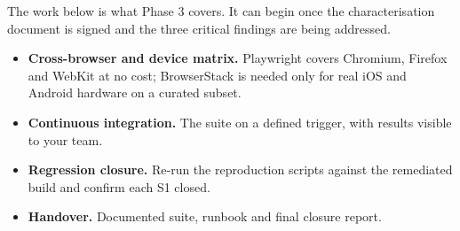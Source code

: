 \documentclass[10pt,a4paper]{article}
\begin{document}
The work below is what Phase 3 covers. It can begin once the characterisation document is
signed and the three critical findings are being addressed.


\begin{itemize}
  \item \textbf{Cross-browser and device matrix.} Playwright covers Chromium, Firefox and WebKit at
        no cost; BrowserStack is needed only for real iOS and Android hardware on a curated subset.
  \item \textbf{Continuous integration.} The suite on a defined trigger, with results visible to
        your team.
  \item \textbf{Regression closure.} Re-run the reproduction scripts against the remediated build
        and confirm each S1 closed.
  \item \textbf{Handover.} Documented suite, runbook and final closure report.
\end{itemize}
\end{document}
